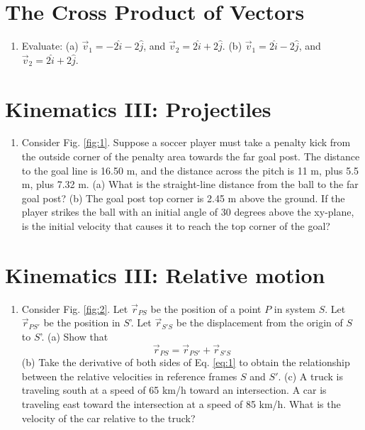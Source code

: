 \documentclass{article}
\begin{document}
\section{The Cross Product of Vectors}

\begin{enumerate}
\item Evaluate: (a) $\vec{v}_1 = -2 \hat{i} - 2 \hat{j}$, and $\vec{v}_2 = 2\hat{i} + 2\hat{j}$. (b) $\vec{v}_1 = 2 \hat{i} - 2 \hat{j}$, and $\vec{v}_2 = 2\hat{i} + 2\hat{j}$.\\ \vspace{0.5cm}
\end{enumerate}

\section{Kinematics III: Projectiles}

\begin{enumerate}
\item Consider Fig. \ref{fig:1}.  Suppose a soccer player must take a penalty kick from the outside corner of the penalty area towards the far goal post.  The distance to the goal line is 16.50 m, and the distance across the pitch is 11 m, plus 5.5 m, plus 7.32 m. (a) What is the straight-line distance from the ball to the far goal post? (b) The goal post top corner is 2.45 m above the ground.  If the player strikes the ball with an initial angle of 30 degrees above the xy-plane, is the initial velocity that causes it to reach the top corner of the goal? \\ \vspace{3.5cm}
\end{enumerate}

\section{Kinematics III: Relative motion}

\begin{enumerate}
\item Consider Fig. \ref{fig:2}.  Let $\vec{r}_{PS}$ be the position of a point $P$ in system $S$.  Let $\vec{r}_{PS'}$ be the position in $S$'.  Let $\vec{r}_{S'S}$ be the displacement from the origin of $S$ to $S$'.  (a) Show that 
\begin{equation}
\vec{r}_{PS} = \vec{r}_{PS'}+\vec{r}_{S'S} \label{eq:1}
\end{equation}
(b) Take the derivative of both sides of Eq. \ref{eq:1} to obtain the relationship between the relative velocities in reference frames $S$ and $S'$. (c) A truck is traveling south at a speed of 65 km/h toward an intersection. A car is traveling east toward the intersection at a speed of 85 km/h. What is the velocity of the car relative to the truck?
\end{enumerate}
\end{document}
